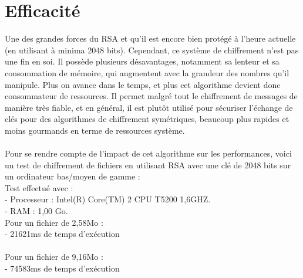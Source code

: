 	\section{Efficacité}
		Une des grandes forces du RSA et qu'il est encore bien protégé à l'heure actuelle (en utilisant à minima 2048 bits). Cependant, ce système de chiffrement n'est pas une fin en soi. Il possède plusieurs désavantages, notamment sa lenteur et sa consommation de mémoire, qui augmentent avec la grandeur des nombres qu'il manipule. Plus on avance dans le temps, et plus cet algorithme devient donc consommateur de ressources. Il permet malgré tout le chiffrement de messages de manière très fiable, et en général, il est plutôt utilisé pour sécuriser l'échange de clés pour des algorithmes de chiffrement symétriques, beaucoup plus rapides et moins gourmands en terme de ressources système.\\
		\\
		Pour se rendre compte de l'impact de cet algorithme sur les performances, voici un test de chiffrement de fichiers en utilisant RSA avec une clé de 2048 bits sur un ordinateur bas/moyen de gamme :\\
			Test effectué avec :\\
			- Processeur : Intel(R) Core(TM) 2 CPU T5200 1,6GHZ.\\
			- RAM : 1,00 Go.\\
			
			Pour un fichier de 2,58Mo :\\
				- 21621ms de temps d'exécution\\\\ 
			Pour un fichier de 9,16Mo :\\
				- 74583ms de temps d'exécution\\
